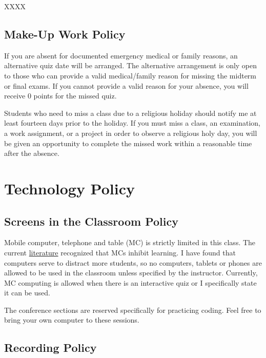 \documentclass[11pt,]{article}
\begin{document}
XXXX

\subsection{Make-Up Work Policy}\label{make-up-work-policy}

If you are absent for documented emergency medical or family reasons, an
alternative quiz date will be arranged. The alternative arrangement is
only open to those who can provide a valid medical/family reason for
missing the midterm or final exams. If you cannot provide a valid reason
for your absence, you will receive 0 points for the missed quiz.

Students who need to miss a class due to a religious holiday should
notify me at least fourteen days prior to the holiday. If you must miss
a class, an examination, a work assignment, or a project in order to
observe a religious holy day, you will be given an opportunity to
complete the missed work within a reasonable time after the absence.

\section{Technology Policy}\label{technology-policy}

\subsection{Screens in the Classroom
Policy}\label{screens-in-the-classroom-policy}

Mobile computer, telephone and table (MC) is strictly limited in this
class. The current
\href{http://www.psychologicalscience.org/index.php/news/releases/take-notes-by-hand-for-better-long-term-comprehension.html}{literature}
recognized that MCs inhibit learning. I have found that computers serve
to distract more students, so no computers, tablets or phones are
allowed to be used in the classroom unless specified by the instructor.
Currently, MC computing is allowed when there is an interactive quiz or
I specifically state it can be used.

The conference sections are reserved specifically for practicing coding.
Feel free to bring your own computer to these sessions.

\subsection{Recording Policy}\label{recording-policy}
\end{document}
